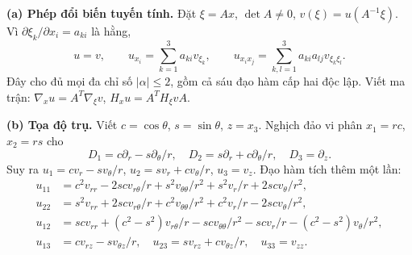 \textbf{(a) Phép đổi biến tuyến tính.} Đặt $\xi=Ax$, $\det A\ne0$, $v(\xi)=u(A^{-1}\xi)$. Vì $\partial\xi_k/\partial x_i=a_{ki}$ là hằng,
\[u=v,\qquad u_{x_i}=\sum_{k=1}^3a_{ki}v_{\xi_k},\qquad
u_{x_ix_j}=\sum_{k,l=1}^3a_{ki}a_{lj}v_{\xi_k\xi_l}.\]
Đây cho đủ mọi đa chỉ số $|\alpha|\le2$, gồm cả sáu đạo hàm cấp hai độc lập. Viết ma trận: $\nabla_xu=A^T\nabla_\xi v$, $H_xu=A^T H_\xi v A$.

\textbf{(b) Tọa độ trụ.} Viết $c=\cos\theta$, $s=\sin\theta$, $z=x_3$. Nghịch đảo vi phân $x_1=rc$, $x_2=rs$ cho
\[D_1=c\partial_r-s\partial_\theta/r,\quad D_2=s\partial_r+c\partial_\theta/r,\quad D_3=\partial_z.\]
Suy ra $u_1=cv_r-sv_\theta/r$, $u_2=sv_r+cv_\theta/r$, $u_3=v_z$. Đạo hàm tích thêm một lần:
\begin{align*}
u_{11}&=c^2v_{rr}-2scv_{r\theta}/r+s^2v_{\theta\theta}/r^2+s^2v_r/r+2scv_\theta/r^2,\\
u_{22}&=s^2v_{rr}+2scv_{r\theta}/r+c^2v_{\theta\theta}/r^2+c^2v_r/r-2scv_\theta/r^2,\\
u_{12}&=scv_{rr}+(c^2-s^2)v_{r\theta}/r-scv_{\theta\theta}/r^2-scv_r/r-(c^2-s^2)v_\theta/r^2,\\
u_{13}&=cv_{rz}-sv_{\theta z}/r,\quad
u_{23}=sv_{rz}+cv_{\theta z}/r,\quad u_{33}=v_{zz}.
\end{align*}

